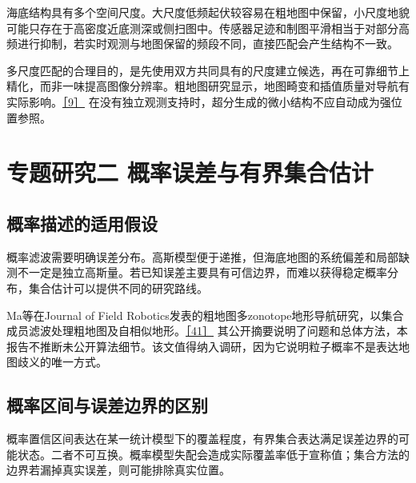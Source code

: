 海底结构具有多个空间尺度。大尺度低频起伏较容易在粗地图中保留，小尺度地貌可能只存在于高密度近底测深或侧扫图中。传感器足迹和制图平滑相当于对部分高频进行抑制，若实时观测与地图保留的频段不同，直接匹配会产生结构不一致。

多尺度匹配的合理目的，是先使用双方共同具有的尺度建立候选，再在可靠细节上精化，而非一味提高图像分辨率。粗地图研究显示，地图畸变和插值质量对导航有实际影响。\href{https://eprints.soton.ac.uk/480480/1/joe.pdf}{［9］} 在没有独立观测支持时，超分生成的微小结构不应自动成为强位置参照。

\hypertarget{ux4e13ux9898ux7814ux7a76ux4e8c-ux6982ux7387ux8befux5deeux4e0eux6709ux754cux96c6ux5408ux4f30ux8ba1}{%
\section{专题研究二 概率误差与有界集合估计}\label{ux4e13ux9898ux7814ux7a76ux4e8c-ux6982ux7387ux8befux5deeux4e0eux6709ux754cux96c6ux5408ux4f30ux8ba1}}

\hypertarget{ux6982ux7387ux63cfux8ff0ux7684ux9002ux7528ux5047ux8bbe}{%
\subsection{概率描述的适用假设}\label{ux6982ux7387ux63cfux8ff0ux7684ux9002ux7528ux5047ux8bbe}}

概率滤波需要明确误差分布。高斯模型便于递推，但海底地图的系统偏差和局部缺测不一定是独立高斯量。若已知误差主要具有可信边界，而难以获得稳定概率分布，集合估计可以提供不同的研究路线。

Ma等在Journal of Field Robotics发表的粗地图多zonotope地形导航研究，以集合成员滤波处理粗地图及自相似地形。\href{https://onlinelibrary.wiley.com/doi/abs/10.1002/rob.22407}{［41］} 其公开摘要说明了问题和总体方法，本报告不推断未公开算法细节。该文值得纳入调研，因为它说明粒子概率不是表达地图歧义的唯一方式。

\hypertarget{ux6982ux7387ux533aux95f4ux4e0eux8befux5deeux8fb9ux754cux7684ux533aux522b}{%
\subsection{概率区间与误差边界的区别}\label{ux6982ux7387ux533aux95f4ux4e0eux8befux5deeux8fb9ux754cux7684ux533aux522b}}

概率置信区间表达在某一统计模型下的覆盖程度，有界集合表达满足误差边界的可能状态。二者不可互换。概率模型失配会造成实际覆盖率低于宣称值；集合方法的边界若漏掉真实误差，则可能排除真实位置。

